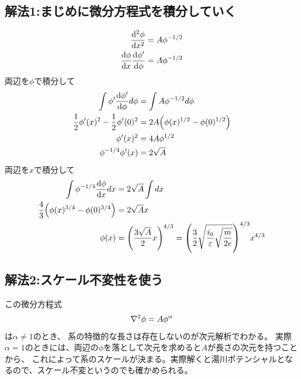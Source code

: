 \documentclass[../ap_2013.tex]{subfiles}
\begin{document}
\subsection*{解法1:まじめに微分方程式を積分していく}
\begin{equation}\begin{aligned}[b]
    \dv[2]{\phi}{x} &=A\phi^{-1/2}\\
    \dv{\phi}{x}\dv{\phi'}{\phi} &=A\phi^{-1/2}
\end{aligned}\end{equation}
両辺を\(\phi\)で積分して
\begin{equation}\begin{aligned}[b]
    \int \phi'\dv{\phi'}{\phi}d\phi &= \int A\phi^{-1/2}d\phi\\
    \frac{1}{2}\phi'(x)^2-\frac{1}{2}\phi'(0)^2&=2A\qty(\phi(x)^{1/2}-\phi(0)^{1/2})\\
    \phi'(x)^2 &= 4A\phi^{1/2}\\
    \phi^{-1/4}\phi'(x) &= 2\sqrt{A}
\end{aligned}\end{equation}
両辺を\(x\)で積分して
\begin{equation}\begin{aligned}[b]
    \int \phi^{-1/4}\dv{\phi}{x}dx &= 2\sqrt{A}\int dx\\
    \frac{4}{3}\qty(\phi(x)^{3/4}-\phi(0)^{3/4}) &= 2\sqrt{A}x\\
    \phi(x) &= \qty(\frac{3\sqrt{A}}{2}x)^{4/3}
    =\qty(\frac{3}{2}\sqrt{\frac{i_0}{\varepsilon}\sqrt{\frac{m}{2e}}})^{4/3}x^{4/3}
\end{aligned}\end{equation}

\subsection*{解法2:スケール不変性を使う}
この微分方程式
\begin{equation*}\begin{aligned}[b]
    \laplacian{\phi} = A\phi^{\alpha}
\end{aligned}\end{equation*}
は\(\alpha\neq 1\)のとき、
系の特徴的な長さは存在しないのが次元解析でわかる。
実際\(\alpha=1\)のときには、両辺の\(\phi\)を落として次元を求めると\(A\)が長さの次元を持つことから、
これによって系のスケールが決まる。実際解くと湯川ポテンシャルとなるので、スケール不変というのでも確かめられる。
\end{document}
